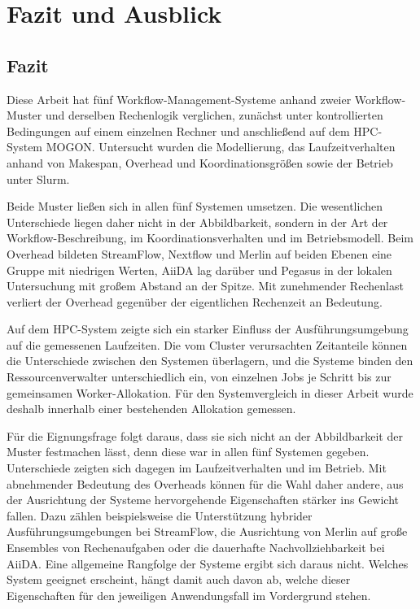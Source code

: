 
\chapter{Fazit und Ausblick}
\label{sec:conclusion}

\section{Fazit}
\label{sec:conclusion:fazit}

Diese Arbeit hat fünf Workflow-Management-Systeme anhand zweier
Workflow-Muster und derselben Rechenlogik verglichen, zunächst
unter kontrollierten Bedingungen auf einem einzelnen Rechner und
anschließend auf dem HPC-System MOGON. Untersucht wurden die
Modellierung, das Laufzeitverhalten anhand von Makespan, Overhead
und Koordinationsgrößen sowie der Betrieb unter Slurm.

Beide Muster ließen sich in allen fünf Systemen umsetzen. Die
wesentlichen Unterschiede liegen daher nicht in der Abbildbarkeit,
sondern in der Art der Workflow-Beschreibung, im
Koordinationsverhalten und im Betriebsmodell. Beim Overhead
bildeten StreamFlow, Nextflow und Merlin auf beiden Ebenen eine
Gruppe mit niedrigen Werten, AiiDA lag darüber und Pegasus in der
lokalen Untersuchung mit großem Abstand an der Spitze. Mit zunehmender Rechenlast verliert der Overhead gegenüber der
eigentlichen Rechenzeit an Bedeutung.

Auf dem HPC-System zeigte sich ein starker Einfluss der
Ausführungsumgebung auf die gemessenen Laufzeiten. Die vom Cluster verursachten Zeitanteile können die Unterschiede zwischen den Systemen überlagern, und die Systeme binden den Ressourcenverwalter
unterschiedlich ein, von einzelnen Jobs je Schritt bis zur
gemeinsamen Worker-Allokation. Für den Systemvergleich in dieser Arbeit wurde deshalb innerhalb einer bestehenden Allokation gemessen.

Für die Eignungsfrage folgt daraus, dass sie sich nicht an der
Abbildbarkeit der Muster festmachen lässt, denn diese war in allen
fünf Systemen gegeben. Unterschiede zeigten sich dagegen im
Laufzeitverhalten und im Betrieb. Mit abnehmender Bedeutung des
Overheads können für die Wahl daher andere, aus der Ausrichtung der
Systeme hervorgehende Eigenschaften stärker ins Gewicht fallen.
Dazu zählen beispielsweise die Unterstützung hybrider
Ausführungsumgebungen bei StreamFlow, die Ausrichtung von Merlin
auf große Ensembles von Rechenaufgaben oder die dauerhafte
Nachvollziehbarkeit bei AiiDA. Eine allgemeine Rangfolge der
Systeme ergibt sich daraus nicht. Welches System geeignet
erscheint, hängt damit auch davon ab, welche dieser Eigenschaften
für den jeweiligen Anwendungsfall im Vordergrund stehen.

